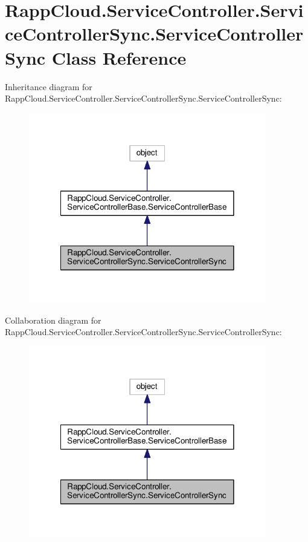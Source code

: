 \hypertarget{classRappCloud_1_1ServiceController_1_1ServiceControllerSync_1_1ServiceControllerSync}{\section{Rapp\-Cloud.\-Service\-Controller.\-Service\-Controller\-Sync.\-Service\-Controller\-Sync Class Reference}
\label{classRappCloud_1_1ServiceController_1_1ServiceControllerSync_1_1ServiceControllerSync}
}


Inheritance diagram for Rapp\-Cloud.\-Service\-Controller.\-Service\-Controller\-Sync.\-Service\-Controller\-Sync\-:
\nopagebreak
\begin{figure}[H]
\begin{center}
\leavevmode
\includegraphics[width=294pt]{classRappCloud_1_1ServiceController_1_1ServiceControllerSync_1_1ServiceControllerSync__inherit__graph}
\end{center}
\end{figure}


Collaboration diagram for Rapp\-Cloud.\-Service\-Controller.\-Service\-Controller\-Sync.\-Service\-Controller\-Sync\-:
\nopagebreak
\begin{figure}[H]
\begin{center}
\leavevmode
\includegraphics[width=294pt]{classRappCloud_1_1ServiceController_1_1ServiceControllerSync_1_1ServiceControllerSync__coll__graph}
\end{center}
\end{figure}
